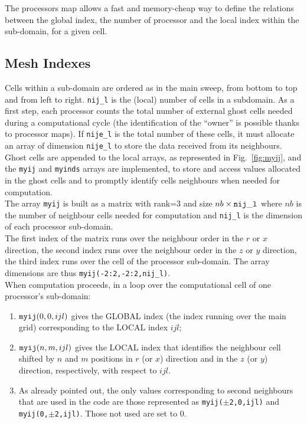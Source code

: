 The processors map allows a fast and memory-cheap way to define the relations
between the global index, the number of processor and the local index 
within the sub-domain, for a given cell.\\
%
\subsection{Mesh Indexes}
Cells within a sub-domain are ordered as in the main sweep, from bottom to top and
from left to right. {\tt nij\_l} is the (local) number of cells in a subdomain.
As a first step, each processor counts the total number of external ghost cells
needed during a computational cycle (the identification of the ``owner'' is 
possible thanks to processor maps). If {\tt nije\_l} is the total number of these 
cells, it must allocate an array of dimension {\tt nije\_l} to store the data received
from its neighbours. Ghost cells are appended to the local arrays, as represented
in Fig.~\ref{fig:myij}, and the {\tt myij} and {\tt myinds} arrays are implemented,
 to store and access values allocated in the ghost cells and to promptly
identify cells neighbours when needed for computation.\\
The array {\tt myij} is built as a matrix with rank=3 and size 
$nb \times {\tt nij\_l}$ where $nb$ is the number of neighbour cells 
needed for computation and {\tt nij\_l} is the dimension of each processor
sub-domain.\\
The first index of the matrix runs over the neighbour order in the $r$ or $x$ 
direction, the second index runs over the neighbour order in the $z$ or $y$ 
direction, the third index runs over the cell of the processor sub-domain.
The array dimensions are thus {\tt myij(-2:2,-2:2,nij\_l)}.\\ 
When computation proceeds, in a loop over the computational
cell of one processor's sub-domain:
\begin{enumerate}
\item ${\tt myij}(0,0,ijl)$ gives the GLOBAL index (the index running 
      over the main grid) corresponding to the LOCAL index $ijl$;
\item ${\tt myij}(n,m,ijl)$ gives the LOCAL index that identifies the neighbour
      cell shifted by $n$ and $m$ positions in $r$ (or $x$) direction 
      and in the $z$ (or $y$) direction, respectively, with respect to $ijl$. 
\item As already pointed out, the only values corresponding to
      second neighbours that are used in the code are those represented as
      {\tt myij($\pm$2,0,ijl)} and {\tt myij(0,$\pm$2,ijl)}. Those not used
      are set to 0.
\end{enumerate}

